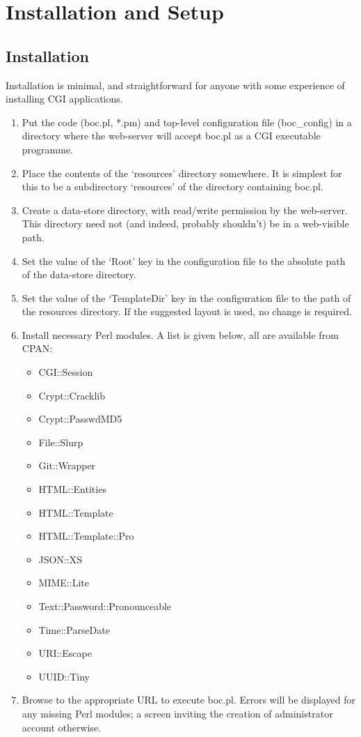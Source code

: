 \documentclass{report}
\begin{document}
\chapter{Installation and Setup}

\section{Installation}

Installation is minimal, and straightforward for anyone with some experience of installing CGI applications.

\begin{enumerate}
\item Put the code (boc.pl, *.pm) and top-level configuration file (boc\_config) in a directory where the web-server will accept boc.pl as a CGI executable programme.
\item Place the contents of the `resources' directory somewhere.  It is simplest for this to be a subdirectory `resources' of the directory containing boc.pl.
\item Create a data-store directory, with read/write permission by the web-server.  This directory need not (and indeed, probably shouldn't) be in a web-visible path.
\item Set the value of the `Root' key in the configuration file to the absolute path of the data-store directory.
\item Set the value of the `TemplateDir' key in the configuration file to the path of the resources directory.  If the suggested layout is used, no change is required.
\item Install necessary Perl modules.  A list is given below, all are available from CPAN:
	\begin{itemize}
	\item CGI::Session
	\item Crypt::Cracklib
	\item Crypt::PasswdMD5
	\item File::Slurp
	\item Git::Wrapper
	\item HTML::Entities
	\item HTML::Template
	\item HTML::Template::Pro
	\item JSON::XS
	\item MIME::Lite
	\item Text::Password::Pronounceable
	\item Time::ParseDate
	\item URI::Escape
	\item UUID::Tiny
	\end{itemize}
\item Browse to the appropriate URL to execute boc.pl.  Errors will be displayed for any missing Perl modules; a screen inviting the creation of administrator account otherwise.
\end{enumerate}
\end{document}
